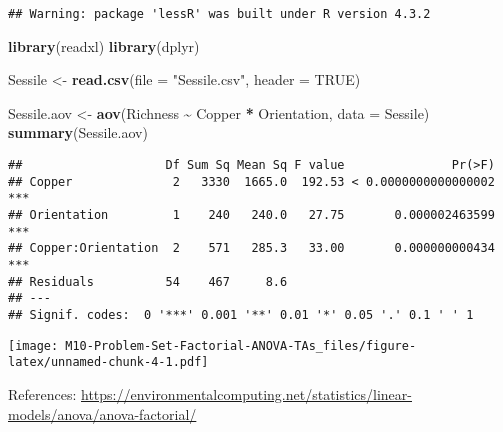 \documentclass[
]{article}
\newenvironment{Shaded}{\begin{snugshade}}{\end{snugshade}}
\newcommand{\AttributeTok}[1]{\textcolor[rgb]{0.13,0.29,0.53}{#1}}
\newcommand{\ConstantTok}[1]{\textcolor[rgb]{0.56,0.35,0.01}{#1}}
\newcommand{\FunctionTok}[1]{\textcolor[rgb]{0.13,0.29,0.53}{\textbf{#1}}}
\newcommand{\NormalTok}[1]{#1}
\newcommand{\OtherTok}[1]{\textcolor[rgb]{0.56,0.35,0.01}{#1}}
\newcommand{\SpecialCharTok}[1]{\textcolor[rgb]{0.81,0.36,0.00}{\textbf{#1}}}
\newcommand{\StringTok}[1]{\textcolor[rgb]{0.31,0.60,0.02}{#1}}
\begin{document}
\begin{verbatim}
## Warning: package 'lessR' was built under R version 4.3.2
\end{verbatim}

\begin{Shaded}
\begin{Highlighting}[]
\FunctionTok{library}\NormalTok{(readxl)}
\FunctionTok{library}\NormalTok{(dplyr)}
\end{Highlighting}
\end{Shaded}

\begin{Shaded}
\begin{Highlighting}[]
\NormalTok{Sessile }\OtherTok{\textless{}{-}} \FunctionTok{read.csv}\NormalTok{(}\AttributeTok{file =} \StringTok{"Sessile.csv"}\NormalTok{, }\AttributeTok{header =} \ConstantTok{TRUE}\NormalTok{)}
\end{Highlighting}
\end{Shaded}

\begin{Shaded}
\begin{Highlighting}[]
\NormalTok{Sessile.aov }\OtherTok{\textless{}{-}} \FunctionTok{aov}\NormalTok{(Richness }\SpecialCharTok{\textasciitilde{}}\NormalTok{ Copper }\SpecialCharTok{*}\NormalTok{ Orientation, }\AttributeTok{data =}\NormalTok{ Sessile)}
\FunctionTok{summary}\NormalTok{(Sessile.aov)}
\end{Highlighting}
\end{Shaded}

\begin{verbatim}
##                    Df Sum Sq Mean Sq F value               Pr(>F)    
## Copper              2   3330  1665.0  192.53 < 0.0000000000000002 ***
## Orientation         1    240   240.0   27.75       0.000002463599 ***
## Copper:Orientation  2    571   285.3   33.00       0.000000000434 ***
## Residuals          54    467     8.6                                 
## ---
## Signif. codes:  0 '***' 0.001 '**' 0.01 '*' 0.05 '.' 0.1 ' ' 1
\end{verbatim}

\begin{Shaded}
\end{Shaded}

\texttt{[image: M10-Problem-Set-Factorial-ANOVA-TAs\_files/figure-latex/unnamed-chunk-4-1.pdf]}

References:
\url{https://environmentalcomputing.net/statistics/linear-models/anova/anova-factorial/}
\end{document}
